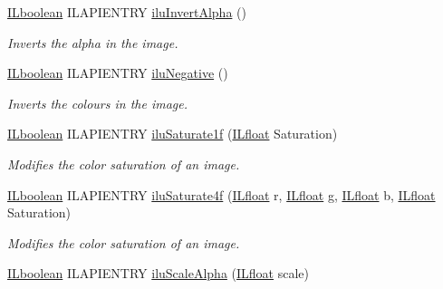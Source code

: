 \begin{DoxyCompactItemize}
\hyperlink{group__il__types_gaa6aa7c95cfdc06b4d8601ef832b7bb0a}{I\+Lboolean} I\+L\+A\+P\+I\+E\+N\+T\+R\+Y \hyperlink{group__ilu__colour_ga0e3910809ea18e77a83cee05e12613ef}{ilu\+Invert\+Alpha} ()
\begin{DoxyCompactList}\small\item\em Inverts the alpha in the image. \end{DoxyCompactList}\item 
\hypertarget{group__ilu__colour_ga9606e892974b44e5457bc6f95de0970d}{\hyperlink{group__il__types_gaa6aa7c95cfdc06b4d8601ef832b7bb0a}{I\+Lboolean} I\+L\+A\+P\+I\+E\+N\+T\+R\+Y \hyperlink{group__ilu__colour_ga9606e892974b44e5457bc6f95de0970d}{ilu\+Negative} ()}\label{group__ilu__colour_ga9606e892974b44e5457bc6f95de0970d}

\begin{DoxyCompactList}\small\item\em Inverts the colours in the image. \end{DoxyCompactList}\item 
\hyperlink{group__il__types_gaa6aa7c95cfdc06b4d8601ef832b7bb0a}{I\+Lboolean} I\+L\+A\+P\+I\+E\+N\+T\+R\+Y \hyperlink{group__ilu__colour_gaa8f7b3bdc21492fddac12dd823051c3b}{ilu\+Saturate1f} (\hyperlink{group__il__types_ga376156c9461893f4b1a5de9579dc86f2}{I\+Lfloat} Saturation)
\begin{DoxyCompactList}\small\item\em Modifies the color saturation of an image. \end{DoxyCompactList}\item 
\hyperlink{group__il__types_gaa6aa7c95cfdc06b4d8601ef832b7bb0a}{I\+Lboolean} I\+L\+A\+P\+I\+E\+N\+T\+R\+Y \hyperlink{group__ilu__colour_gac117ee194f9075d2600f147e08a59251}{ilu\+Saturate4f} (\hyperlink{group__il__types_ga376156c9461893f4b1a5de9579dc86f2}{I\+Lfloat} r, \hyperlink{group__il__types_ga376156c9461893f4b1a5de9579dc86f2}{I\+Lfloat} g, \hyperlink{group__il__types_ga376156c9461893f4b1a5de9579dc86f2}{I\+Lfloat} b, \hyperlink{group__il__types_ga376156c9461893f4b1a5de9579dc86f2}{I\+Lfloat} Saturation)
\begin{DoxyCompactList}\small\item\em Modifies the color saturation of an image. \end{DoxyCompactList}\item 
\hyperlink{group__il__types_gaa6aa7c95cfdc06b4d8601ef832b7bb0a}{I\+Lboolean} I\+L\+A\+P\+I\+E\+N\+T\+R\+Y \hyperlink{group__ilu__colour_ga12f99569c175ef8b6f26c7713703380c}{ilu\+Scale\+Alpha} (\hyperlink{group__il__types_ga376156c9461893f4b1a5de9579dc86f2}{I\+Lfloat} scale)

\end{DoxyCompactItemize}
